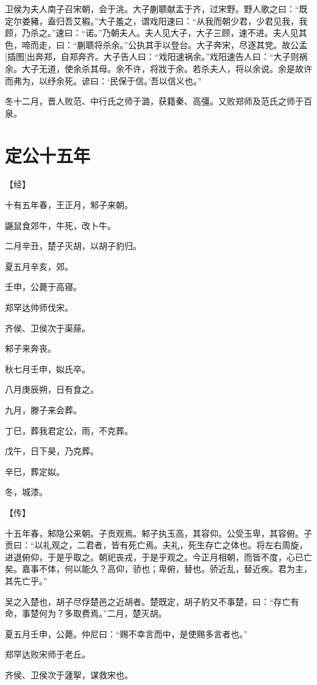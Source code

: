 \documentclass[a4paper,12pt,UTF8,twoside]{ctexbook}
\begin{document}
卫侯为夫人南子召宋朝，会于洮。大子蒯聩献盂于齐，过宋野。野人歌之曰：“既定尔娄豬，盍归吾艾豭。”大子羞之，谓戏阳速曰：“从我而朝少君，少君见我，我顾，乃杀之。”速曰：“诺。”乃朝夫人。夫人见大子，大子三顾，速不进。夫人见其色，啼而走，曰：“蒯聩将杀余。”公执其手以登台。大子奔宋，尽逐其党。故公孟[插图]出奔郑，自郑奔齐。大子告人曰：“戏阳速祸余。”戏阳速告人曰：“大子则祸余。大子无道，使余杀其母。余不许，将戕于余。若杀夫人，将以余说。余是故许而弗为，以纾余死。谚曰：‘民保于信。’吾以信义也。”

冬十二月，晋人败范、中行氏之师于潞，获籍秦、高彊。又败郑师及范氏之师于百泉。


\section{定公十五年}



【经】

十有五年春，王正月，邾子来朝。

鼷鼠食郊牛，牛死，改卜牛。

二月辛丑，楚子灭胡，以胡子豹归。

夏五月辛亥，郊。

壬申，公薨于高寝。

郑罕达帅师伐宋。

齐侯、卫侯次于渠蒢。

邾子来奔丧。

秋七月壬申，姒氏卒。

八月庚辰朔，日有食之。

九月，滕子来会葬。

丁巳，葬我君定公，雨，不克葬。

戊午，日下昊，乃克葬。

辛巳，葬定姒。

冬，城漆。

【传】

十五年春，邾隐公来朝。子贡观焉。邾子执玉高，其容仰。公受玉卑，其容俯。子贡曰：“以礼观之，二君者，皆有死亡焉。夫礼，死生存亡之体也。将左右周旋，进退俯仰，于是乎取之。朝祀丧戎，于是乎观之。今正月相朝，而皆不度，心已亡矣。嘉事不体，何以能久？高仰，骄也；卑俯，替也。骄近乱，替近疾。君为主，其先亡乎。”

吴之入楚也，胡子尽俘楚邑之近胡者。楚既定，胡子豹又不事楚，曰：“存亡有命，事楚何为？多取费焉。”二月，楚灭胡。

夏五月壬申，公薨。仲尼曰：“赐不幸言而中，是使赐多言者也。”

郑罕达败宋师于老丘。

齐侯、卫侯次于蘧挐，谋救宋也。
\end{document}
